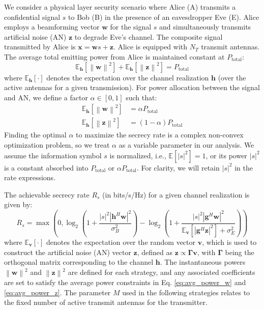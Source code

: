 \documentclass[10pt,a4paper]{article} %
\newcommand{\norm}[1]{\left\| #1 \right\|}
\newcommand{\abs}[1]{\left| #1 \right|}
\newcommand{\herm}{^H} %
\newcommand{\E}{\mathbb{E}} %
\begin{document}
We consider a physical layer security scenario where Alice (A) transmits a confidential signal $s$ to Bob (B) in the presence of an eavesdropper Eve (E). Alice employs a beamforming vector $\mathbf{w}$ for the signal $s$ and simultaneously transmits artificial noise (AN) $\mathbf{z}$ to degrade Eve's channel. The composite signal transmitted by Alice is $\mathbf{x} = \mathbf{w}s + \mathbf{z}$.
Alice is equipped with $N_T$ transmit antennas.
The average total emitting power from Alice is maintained constant at $P_{\text{total}}$:
\begin{equation}
    \E_{\mathbf{h}}[\norm{\mathbf{w}}^2] + \E_{\mathbf{h}}[\norm{\mathbf{z}}^2] = P_{\text{total}}
\end{equation}
where $\E_{\mathbf{h}}[\cdot]$ denotes the expectation over the channel realization $\mathbf{h}$ (over the active antennas for a given transmission).
For power allocation between the signal and AN, we define a factor $\alpha \in [0,1]$ such that:
\begin{align}
    \E_{\mathbf{h}}[\norm{\mathbf{w}}^2] &= \alpha P_{\text{total}} \label{eq:avg_power_w} \\
    \E_{\mathbf{h}}[\norm{\mathbf{z}}^2] &= (1-\alpha) P_{\text{total}} \label{eq:avg_power_z}
\end{align}
Finding the optimal $\alpha$ to maximize the secrecy rate is a complex non-convex optimization problem, so we treat $\alpha$ as a variable parameter in our analysis. We assume the information symbol $s$ is normalized, i.e., $\E[|s|^2]=1$, or its power $|s|^2$ is a constant absorbed into $P_{\text{total}}$ or $\alpha P_{\text{total}}$. For clarity, we will retain $|s|^2$ in the rate expressions.

The achievable secrecy rate $R_s$ (in bits/s/Hz) for a given channel realization is given by:
\begin{equation} \label{eq:secrecy_rate}
R_s = \max\left(0, \log_2\left(1 + \frac{|s|^2 \abs{\mathbf{h}\herm \mathbf{w}}^2}{\sigma_B^2}\right) - \log_2\left(1 + \frac{|s|^2 \abs{\mathbf{g}\herm \mathbf{w}}^2}{\E_{\mathbf{v}}\left[\abs{\mathbf{g}\herm \mathbf{z}}^2\right] + \sigma_E^2}\right)\right)
\end{equation}
where $\mathbb{E}_{\mathbf{v}}[\cdot]$ denotes the expectation over the random vector $\mathbf{v}$, which is used to construct the artificial noise (AN) vector $\mathbf{z}$, defined as $\mathbf{z} \propto \boldsymbol{\Gamma} \mathbf{v}$, with $\boldsymbol{\Gamma}$ being the orthogonal matrix corresponding to the channel $\mathbf{h}$. The instantaneous powers $\norm{\mathbf{w}}^2$ and $\norm{\mathbf{z}}^2$ are defined for each strategy, and any associated coefficients are set to satisfy the average power constraints in Eq. \eqref{eq:avg_power_w} and \eqref{eq:avg_power_z}. The parameter $M$ used in the following strategies relates to the fixed number of active transmit antennas for the transmitter.
\end{document}
